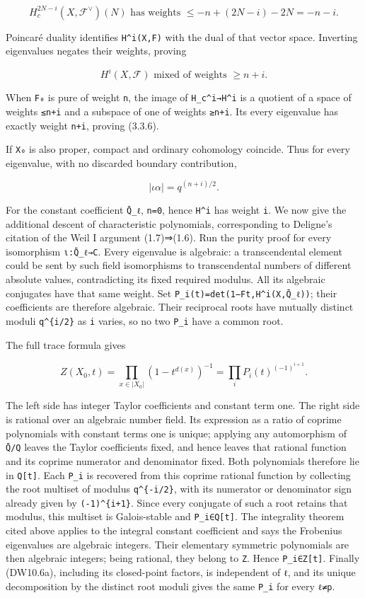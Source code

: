 \documentclass[
]{report}
\begin{document}
\[
H_c^{2N-i}(X,\mathcal F^\vee)(N)
\text{ has weights }\le
-n+(2N-i)-2N=-n-i.
\tag{DW10.4}
\]

Poincaré duality identifies \texttt{H\^{}i(X,F)} with the dual of that
vector space. Inverting eigenvalues negates their weights, proving

\[
H^i(X,\mathcal F)\text{ mixed of weights }\ge n+i.
\tag{DW10.5}
\]

When \texttt{F₀} is pure of weight \texttt{n}, the image of
\texttt{H\_c\^{}i→H\^{}i} is a quotient of a space of weights
\texttt{≤n+i} and a subspace of one of weights \texttt{≥n+i}. Its every
eigenvalue has exactly weight \texttt{n+i}, proving (3.3.6).

If \texttt{X₀} is also proper, compact and ordinary cohomology coincide.
Thus for every eigenvalue, with no discarded boundary contribution,

\[
\boxed{|\iota\alpha|=q^{(n+i)/2}.}
\tag{DW10.6}
\]

For the constant coefficient \texttt{Q̄\_ℓ}, \texttt{n=0}, hence
\texttt{H\^{}i} has weight \texttt{i}. We now give the additional
descent of characteristic polynomials, corresponding to Deligne's
citation of the Weil I argument (1.7)⇒(1.6). Run the purity proof for
every isomorphism \texttt{ι:Q̄\_ℓ→C}. Every eigenvalue is algebraic: a
transcendental element could be sent by such field isomorphisms to
transcendental numbers of different absolute values, contradicting its
fixed required modulus. All its algebraic conjugates have that same
weight. Set \nolinkurl{P_i(t)=det(1−Ft,H^i(X,Q̄_ℓ))}; their coefficients
are therefore algebraic. Their reciprocal roots have mutually distinct
moduli \texttt{q\^{}\{i/2\}} as \texttt{i} varies, so no two
\texttt{P\_i} have a common root.

The full trace formula gives

\[
Z(X_0,t)=\prod_{x\in|X_0|}(1-t^{d(x)})^{-1}
=\prod_i P_i(t)^{(-1)^{i+1}}.
\tag{DW10.6a}
\]

The left side has integer Taylor coefficients and constant term one. The
right side is rational over an algebraic number field. Its expression as
a ratio of coprime polynomials with constant terms one is unique;
applying any automorphism of \texttt{Q̄/Q} leaves the Taylor coefficients
fixed, and hence leaves that rational function and its coprime numerator
and denominator fixed. Both polynomials therefore lie in
\texttt{Q{[}t{]}}. Each \texttt{P\_i} is recovered from this coprime
rational function by collecting the root multiset of modulus
\texttt{q\^{}\{-i/2\}}, with its numerator or denominator sign already
given by \texttt{(-1)\^{}\{i+1\}}. Since every conjugate of such a root
retains that modulus, this multiset is Galois-stable and
\texttt{P\_i∈Q{[}t{]}}. The integrality theorem cited above applies to
the integral constant coefficient and says the Frobenius eigenvalues are
algebraic integers. Their elementary symmetric polynomials are then
algebraic integers; being rational, they belong to \texttt{Z}. Hence
\texttt{P\_i∈Z{[}t{]}}. Finally (DW10.6a), including its closed-point
factors, is independent of \texttt{ℓ}, and its unique decomposition by
the distinct root moduli gives the same \texttt{P\_i} for every
\texttt{ℓ≠p}.
\end{document}
